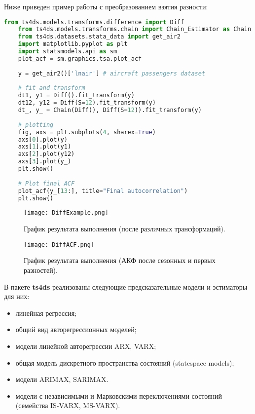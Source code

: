 \documentclass[a4paper,14pt]{extreport}
\begin{document}
	Ниже приведен пример работы с преобразованием взятия разности:
	
	\begin{lstlisting}[language=Python]
	from ts4ds.models.transforms.difference import Diff
	from ts4ds.models.transforms.chain import Chain_Estimator as Chain
	from ts4ds.datasets.stata_data import get_air2
	import matplotlib.pyplot as plt
	import statsmodels.api as sm
	plot_acf = sm.graphics.tsa.plot_acf
	
	y = get_air2()['lnair'] # aircraft passengers dataset
	
	# fit and transform
	dt1, y1 = Diff().fit_transform(y)
	dt12, y12 = Diff(S=12).fit_transform(y)
	dt_, y_ = Chain(Diff(), Diff(S=12)).fit_transform(y)
	
	# plotting
	fig, axs = plt.subplots(4, sharex=True)
	axs[0].plot(y)
	axs[1].plot(y1)
	axs[2].plot(y12)
	axs[3].plot(y_)
	plt.show()
	
	# Plot final ACF
	plot_acf(y_[13:], title="Final autocorrelation")
	plt.show()
	\end{lstlisting}
	
	\begin{figure}
		\texttt{[image: DiffExample.png]}
		\caption{График результата выполнения (после различных трансформаций).}
		\label{fig:ts4ds-diffexample}
	\end{figure}
	\begin{figure}
		\texttt{[image: DiffACF.png]}
		\caption{График результата выполнения (АКФ после сезонных и первых разностей).}
		\label{fig:ts4ds-diffacf}
	\end{figure}
	
	
	В пакете \textbf{ts4ds} реализованы следующие предсказательные модели и эстиматоры для них:
	\begin{itemize}
		\item линейная регрессия;
		\item общий вид авторегрессионных моделей;
		\item модели линейной авторегрессии ARX, VARX;
		\item общая модель дискретного пространства состояний (statespace models);
		\item модели ARIMAX, SARIMAX.
		\item модели с независимыми и Марковскими переключениями состояний (семейства IS-VARX, MS-VARX).
	\end{itemize}
	
\end{document}
